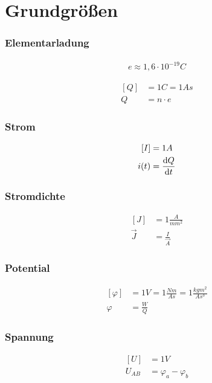 \section{Grundgrößen}

\subsubsection*{Elementarladung}
\begin{multicols}{2}{}
\begin{align*}
e\approx 1,6\cdot 10^{-19}C
\end{align*}
\hfill

\begin{align*}
\left[Q\right]&=1C=1As\\
Q&=n\cdot e
\end{align*}
\end{multicols}


\begin{multicols}{2}{}
\subsubsection*{Strom}
\begin{align*}
\left[I\right]&=1A\\
i(t)&=\frac{\mathop{}\!\mathrm{d} Q}{\mathop{}\!\mathrm{d} t}
\end{align*}

\subsubsection*{Stromdichte}
\begin{align*}
\left[J\right]&=1\frac{A}{mm^2}\\
\vec{J}&=\frac{I}{\vec{A}}
\end{align*}
\end{multicols}


\begin{multicols}{2}{}
\subsubsection*{Potential}
\begin{align*}
\left[\varphi\right]&=1V=1\frac{Nm}{As}=1\frac{kgm^2}{As^3}\\
\varphi&=\frac{W}{Q}
\end{align*}

\subsubsection*{Spannung}
\begin{align*}
\left[U\right]&=1V\\
U_{AB}&=\varphi_a-\varphi_b
\end{align*}
\hfill
\end{multicols}

